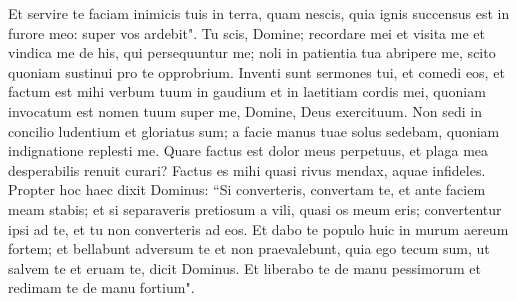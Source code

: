 \begin{biblechapter}
\verse Et servire te faciam inimicis tuis in terra, quam nescis, quia ignis succensus est in furore meo: super vos ardebit". 
\verse Tu scis, Domine; recordare mei et visita me et vindica me de his, qui persequuntur me; noli in patientia tua abripere me, scito quoniam sustinui pro te opprobrium. 
\verse Inventi sunt sermones tui, et comedi eos, et factum est mihi verbum tuum in gaudium et in laetitiam cordis mei, quoniam invocatum est nomen tuum super me, Domine, Deus exercituum. 
\verse Non sedi in concilio ludentium et gloriatus sum; a facie manus tuae solus sedebam, quoniam indignatione replesti me. 
\verse Quare factus est dolor meus perpetuus, et plaga mea desperabilis renuit curari? Factus es mihi quasi rivus mendax, aquae infideles. 
\verse Propter hoc haec dixit Dominus: “Si converteris, convertam te, et ante faciem meam stabis; et si separaveris pretiosum a vili, quasi os meum eris; convertentur ipsi ad te, et tu non converteris ad eos. 
\verse Et dabo te populo huic in murum aereum fortem; et bellabunt adversum te et non praevalebunt, quia ego tecum sum, ut salvem te et eruam te, dicit Dominus. 
\verse Et liberabo te de manu pessimorum et redimam te de manu fortium". 
\end{biblechapter}

